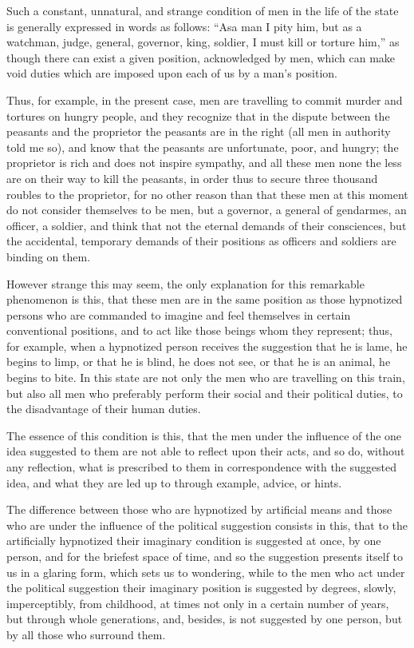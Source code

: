 \documentclass{book}
\begin{document}
Such a constant, unnatural, and strange condition of men in the life of the state is generally expressed in words as follows: “Asa man I pity him, but as a watchman, judge, general, governor, king, soldier, I must kill or torture him,” as though there can exist a given position, acknowledged by men, which can make void duties which are imposed upon each of us by a man’s position.

Thus, for example, in the present case, men are travelling to commit murder and tortures on hungry people, and they recognize that in the dispute between the peasants and the proprietor the peasants are in the right (all men in authority told me so), and know that the peasants are unfortunate, poor, and hungry; the proprietor is rich and does not inspire sympathy, and all these men none the less are on their way to kill the peasants, in order thus to secure three thousand roubles to the proprietor, for no other reason than that these men at this moment do not consider themselves to be men, but a governor, a general of gendarmes, an officer, a soldier, and think that not the eternal demands of their consciences, but the accidental, temporary demands of their positions as officers and soldiers are binding on them.

However strange this may seem, the only explanation for this remarkable phenomenon is this, that these men are in the same position as those hypnotized persons who are commanded to imagine and feel themselves in certain conventional positions, and to act like those beings whom they represent; thus, for example, when a hypnotized person receives the suggestion that he is lame, he begins to limp, or that he is blind, he does not see, or that he is an animal, he begins to bite. In this state are not only the men who are travelling on this train, but also all men who preferably perform their social and their political duties, to the disadvantage of their human duties.

The essence of this condition is this, that the men under the influence of the one idea suggested to them are not able to reflect upon their acts, and so do, without any reflection, what is prescribed to them in correspondence with the suggested idea, and what they are led up to through example, advice, or hints.

The difference between those who are hypnotized by artificial means and those who are under the influence of the political suggestion consists in this, that to the artificially hypnotized their imaginary condition is suggested at once, by one person, and for the briefest space of time, and so the suggestion presents itself to us in a glaring form, which sets us to wondering, while to the men who act under the political suggestion their imaginary position is suggested by degrees, slowly, imperceptibly, from childhood, at times not only in a certain number of years, but through whole generations, and, besides, is not suggested by one person, but by all those who surround them.
\end{document}
